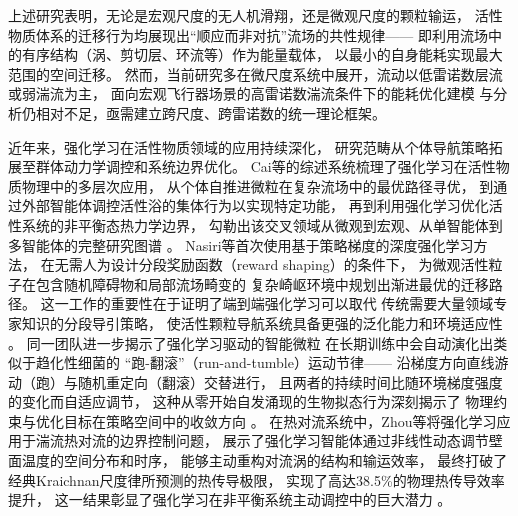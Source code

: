 上述研究表明，无论是宏观尺度的无人机滑翔，还是微观尺度的颗粒输运，
活性物质体系的迁移行为均展现出“顺应而非对抗”流场的共性规律——
即利用流场中的有序结构（涡、剪切层、环流等）作为能量载体，
以最小的自身能耗实现最大范围的空间迁移。
然而，当前研究多在微尺度系统中展开，流动以低雷诺数层流或弱湍流为主，
面向宏观飞行器场景的高雷诺数湍流条件下的能耗优化建模
与分析仍相对不足，亟需建立跨尺度、跨雷诺数的统一理论框架。

近年来，强化学习在活性物质领域的应用持续深化，
研究范畴从个体导航策略拓展至群体动力学调控和系统边界优化。
Cai等的综述系统梳理了强化学习在活性物质物理中的多层次应用，
从个体自推进微粒在复杂流场中的最优路径寻优，
到通过外部智能体调控活性浴的集体行为以实现特定功能，
再到利用强化学习优化活性系统的非平衡态热力学边界，
勾勒出该交叉领域从微观到宏观、从单智能体到多智能体的完整研究图谱
\cite{caiRLActiveMatter2025}。
Nasiri等首次使用基于策略梯度的深度强化学习方法，
在无需人为设计分段奖励函数（reward shaping）的条件下，
为微观活性粒子在包含随机障碍物和局部流场畸变的
复杂崎岖环境中规划出渐进最优的迁移路径。
这一工作的重要性在于证明了端到端强化学习可以取代
传统需要大量领域专家知识的分段导引策略，
使活性颗粒导航系统具备更强的泛化能力和环境适应性
\cite{nasiriRLActiveNavigation2022}。
同一团队进一步揭示了强化学习驱动的智能微粒
在长期训练中会自动演化出类似于趋化性细菌的
“跑-翻滚”（run-and-tumble）运动节律——
沿梯度方向直线游动（跑）与随机重定向（翻滚）交替进行，
且两者的持续时间比随环境梯度强度的变化而自适应调节，
这种从零开始自发涌现的生物拟态行为深刻揭示了
物理约束与优化目标在策略空间中的收敛方向
\cite{nasiriSmartParticlesBacterial2024}。
在热对流系统中，Zhou等将强化学习应用于湍流热对流的边界控制问题，
展示了强化学习智能体通过非线性动态调节壁面温度的空间分布和时序，
能够主动重构对流涡的结构和输运效率，
最终打破了经典Kraichnan尺度律所预测的热传导极限，
实现了高达38.5\%的物理热传导效率提升，
这一结果彰显了强化学习在非平衡系统主动调控中的巨大潜力
\cite{zhouDeepReinforcementLearning2025}。

